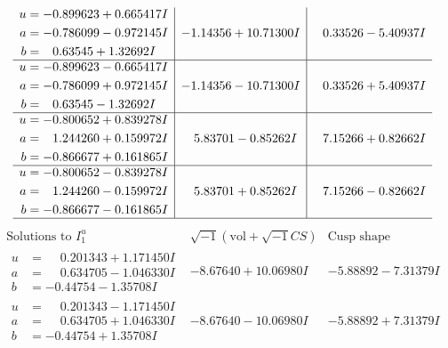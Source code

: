 \documentclass[1p]{elsarticle_modified}
\theoremstyle{definition}
\newcommand{\I}{\sqrt{-1}}
\begin{document}
$$\begin{array}{c|c|c}
\begin{aligned}
u &= -0.899623 + 0.665417 I \\
a &= -0.786099 - 0.972145 I \\
b &= \phantom{-}0.63545 + 1.32692 I\end{aligned}
 & -1.14356 + 10.71300 I & \phantom{-}0.33526 - 5.40937 I \\ \hline\begin{aligned}
u &= -0.899623 - 0.665417 I \\
a &= -0.786099 + 0.972145 I \\
b &= \phantom{-}0.63545 - 1.32692 I\end{aligned}
 & -1.14356 - 10.71300 I & \phantom{-}0.33526 + 5.40937 I \\ \hline\begin{aligned}
u &= -0.800652 + 0.839278 I \\
a &= \phantom{-}1.244260 + 0.159972 I \\
b &= -0.866677 + 0.161865 I\end{aligned}
 & \phantom{-}5.83701 - 0.85262 I & \phantom{-}7.15266 + 0.82662 I \\ \hline\begin{aligned}
u &= -0.800652 - 0.839278 I \\
a &= \phantom{-}1.244260 - 0.159972 I \\
b &= -0.866677 - 0.161865 I\end{aligned}
 & \phantom{-}5.83701 + 0.85262 I & \phantom{-}7.15266 - 0.82662 I\\
 \hline 
 \end{array}$$\newpage$$\begin{array}{c|c|c}  
\text{Solutions to }I^u_{1}& \I (\text{vol} + \sqrt{-1}CS) & \text{Cusp shape}\\
 \hline 
\begin{aligned}
u &= \phantom{-}0.201343 + 1.171450 I \\
a &= \phantom{-}0.634705 - 1.046330 I \\
b &= -0.44754 - 1.35708 I\end{aligned}
 & -8.67640 + 10.06980 I & -5.88892 - 7.31379 I \\ \hline\begin{aligned}
u &= \phantom{-}0.201343 - 1.171450 I \\
a &= \phantom{-}0.634705 + 1.046330 I \\
b &= -0.44754 + 1.35708 I\end{aligned}
 & -8.67640 - 10.06980 I & -5.88892 + 7.31379 I \\ \hline\begin{aligned}

\end{aligned}
\end{array}$$
\end{document}
